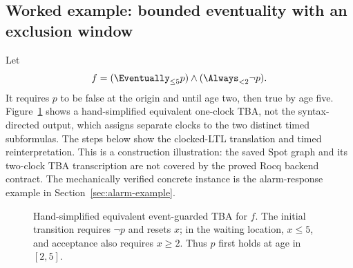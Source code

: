 \subsection{Worked example: bounded eventuality with an exclusion window}
Let
\[
  f=(\Eventually_{\le5}p)\land(\Always_{<2}\neg p).
\]
It requires $p$ to be false at the origin and until age two, then true by age
five. Figure~\ref{fig:translation-reference-tba} shows a hand-simplified
equivalent one-clock TBA, not the syntax-directed output, which assigns
separate clocks to the two distinct timed subformulas. The steps below show
the clocked-LTL translation and timed reinterpretation. This is a construction
illustration: the saved Spot graph and its two-clock TBA transcription are not
covered by the proved Rocq backend contract. The mechanically verified
concrete instance is the alarm-response example in
Section~\ref{sec:alarm-example}.

\begin{figure}[t]
\centering

\caption{Hand-simplified equivalent event-guarded TBA for $f$. The initial
transition requires $\neg p$ and resets $x$; in the waiting location,
$x\le5$, and acceptance also requires $x\ge2$. Thus $p$ first holds at age
in $[2,5]$.}
\label{fig:translation-reference-tba}
\end{figure}


